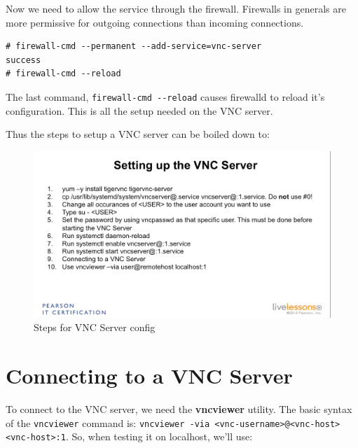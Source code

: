 \noindent
Now we need to allow the service through the firewall. Firewalls in generals are more permissive for outgoing connections than incoming connections. 

\vspace{-15pt}
\begin{verbatim}
# firewall-cmd --permanent --add-service=vnc-server
success
# firewall-cmd --reload
\end{verbatim}
\vspace{-10pt}

\noindent
The last command, \verb|firewall-cmd --reload| causes firewalld to reload it's configuration. This is all the setup needed on the VNC server. 

Thus the steps to setup a VNC server can be boiled down to:

\begin{figure}[H]
	\centering
	\includegraphics[width=0.9\linewidth]{RHCSA/Mod4/chapters/4.26.b}
	\caption{Steps for VNC Server config}
	\label{fig:4 Steps for VNC Server config}
\end{figure}

\section{Connecting to a VNC Server}
To connect to the VNC server, we need the \textbf{vncviewer} utility. The basic syntax of the \verb|vncviewer| command is: \verb|vncviewer -via <vnc-username>@<vnc-host> <vnc-host>:1|. So, when testing it on localhost, we'll use:

